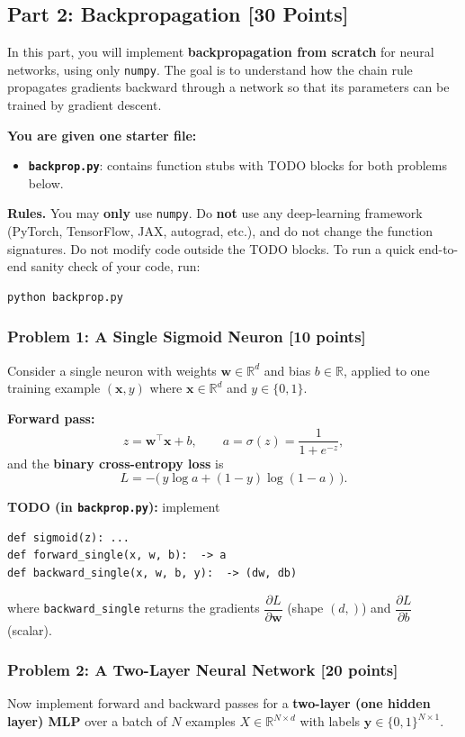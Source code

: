 \documentclass{homework}
\begin{document}
\newpage
\subsection{Part 2: Backpropagation [30 Points]}
In this part, you will implement \textbf{backpropagation from scratch} for neural networks, using only \texttt{numpy}. The goal is to understand how the chain rule propagates gradients backward through a network so that its parameters can be trained by gradient descent.

\textbf{You are given one starter file:}
\begin{itemize}
    \item \textbf{\texttt{backprop.py}}: contains function stubs with TODO blocks for both problems below.
\end{itemize}
\textbf{Rules.} You may \textbf{only} use \texttt{numpy}. Do \textbf{not} use any deep-learning framework (PyTorch, TensorFlow, JAX, autograd, etc.), and do not change the function signatures. Do not modify code outside the TODO blocks. To run a quick end-to-end sanity check of your code, run:
\begin{verbatim}
python backprop.py
\end{verbatim}

\subsubsection{Problem 1: A Single Sigmoid Neuron [10 points]}
Consider a single neuron with weights $\mathbf{w}\in\mathbb{R}^d$ and bias $b\in\mathbb{R}$, applied to one training example $(\mathbf{x}, y)$ where $\mathbf{x}\in\mathbb{R}^d$ and $y\in\{0,1\}$.

\textbf{Forward pass:}
\[
z = \mathbf{w}^\top \mathbf{x} + b,
\qquad
a = \sigma(z) = \frac{1}{1 + e^{-z}},
\]
and the \textbf{binary cross-entropy loss} is
\[
L = -\big(\,y \log a + (1-y)\log(1-a)\,\big).
\]

\textbf{TODO (in \texttt{backprop.py}):} implement
\begin{verbatim}
def sigmoid(z): ...
def forward_single(x, w, b):  -> a
def backward_single(x, w, b, y):  -> (dw, db)
\end{verbatim}
where \texttt{backward\_single} returns the gradients $\dfrac{\partial L}{\partial \mathbf{w}}$ (shape $(d,)$) and $\dfrac{\partial L}{\partial b}$ (scalar).

\subsubsection{Problem 2: A Two-Layer Neural Network [20 points]}
Now implement forward and backward passes for a \textbf{two-layer (one hidden layer) MLP} over a batch of $N$ examples $X\in\mathbb{R}^{N\times d}$ with labels $\mathbf{y}\in\{0,1\}^{N\times 1}$.
\end{document}
